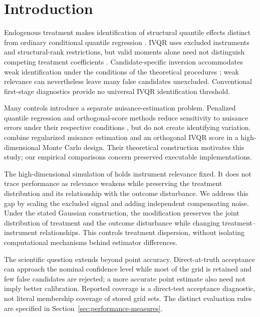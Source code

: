 \section{Introduction}
Endogenous treatment makes identification of structural quantile effects distinct from ordinary conditional quantile regression \parencite{koenker_bassett_1978,chernozhukov_hansen_2005}. IVQR uses excluded instruments and structural-rank restrictions, but valid moments alone need not distinguish competing treatment coefficients \parencite{chernozhukov_hansen_wuthrich_2017}. Candidate-specific inversion accommodates weak identification under the conditions of the theoretical procedures \parencite{chernozhukov_hansen_2008}; weak relevance can nevertheless leave many false candidates unexcluded. Conventional first-stage diagnostics provide no universal IVQR identification threshold.

Many controls introduce a separate nuisance-estimation problem. Penalized quantile regression and orthogonal-score methods reduce sensitivity to nuisance errors under their respective conditions \parencite{belloni_chernozhukov_2011,belloni_chernozhukov_kato_2019,chernozhukov_et_al_2018}, but do not create identifying variation. \textcite{chen_huang_tien_2021} combine regularized nuisance estimation and an orthogonal IVQR score in a high-dimensional Monte Carlo design. Their theoretical construction motivates this study; our empirical comparisons concern preserved executable implementations.

The high-dimensional simulation of \textcite{chen_huang_tien_2021} holds instrument relevance fixed. It does not trace performance as relevance weakens while preserving the treatment distribution and its relationship with the outcome disturbance. We address this gap by scaling the excluded signal and adding independent compensating noise. Under the stated Gaussian construction, the modification preserves the joint distribution of treatment and the outcome disturbance while changing treatment--instrument relationships. This controls treatment dispersion, without isolating computational mechanisms behind estimator differences.

The scientific question extends beyond point accuracy. Direct-at-truth acceptance can approach the nominal confidence level while most of the grid is retained and few false candidates are rejected; a more accurate point estimate also need not imply better calibration. Reported coverage is a direct-test acceptance diagnostic, not literal membership coverage of stored grid sets. The distinct evaluation rules are specified in Section~\ref{sec:performance-measures}.

